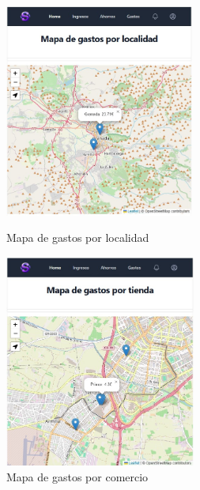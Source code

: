 \begin{figure}[ht!]
    \centering
    \begin{minipage}{0.45\textwidth}
        \centering
        \includegraphics[height = 70mm]{imagenes/mapa_gasto_localidades.jpg}
        \caption{Mapa de gastos por localidad}
        \label{fig:mapa_gasto_localidades}
    \end{minipage}\hfill
    \begin{minipage}{0.45\textwidth}
        \centering
        \includegraphics[height = 70mm]{imagenes/mapa_gasto_comercios.jpg}
        \caption{Mapa de gastos por comercio}
        \label{fig:mapa_gasto_comercios}
    \end{minipage}
\end{figure}